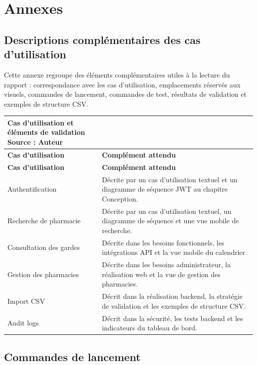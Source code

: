 \chapter{Annexes}
\label{ch:annexes}

\section{Descriptions complémentaires des cas d'utilisation}

Cette annexe regroupe des éléments complémentaires utiles à la lecture du rapport : correspondance avec
les cas d'utilisation, emplacements réservés aux visuels, commandes de lancement, commandes de test,
résultats de validation et exemples de structure CSV.

\begin{longtable}{L{4cm}L{10cm}}
    \caption{Cas d'utilisation et éléments de validation\\ \small Source : Auteur}\\
    \toprule
    \textbf{Cas d'utilisation} & \textbf{Complément attendu} \\
    \midrule
    \endfirsthead
    \toprule
    \textbf{Cas d'utilisation} & \textbf{Complément attendu} \\
    \midrule
    \endhead
    Authentification & Décrite par un cas d'utilisation textuel et un diagramme de séquence JWT au chapitre Conception. \\
    Recherche de pharmacie & Décrite par un cas d'utilisation textuel, un diagramme de séquence et une vue mobile de recherche. \\
    Consultation des gardes & Décrite dans les besoins fonctionnels, les intégrations API et la vue mobile du calendrier. \\
    Gestion des pharmacies & Décrite dans les besoins administrateur, la réalisation web et la vue de gestion des pharmacies. \\
    Import CSV & Décrit dans la réalisation backend, la stratégie de validation et les exemples de structure CSV. \\
    Audit logs & Décrit dans la sécurité, les tests backend et les indicateurs du tableau de bord. \\
    \bottomrule
\end{longtable}

\section{Commandes de lancement}

